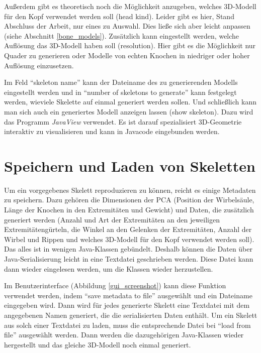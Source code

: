Außerdem gibt es theoretisch noch die Möglichkeit anzugeben, welches 3D-Modell für den Kopf verwendet werden soll (head kind). Leider gibt es hier, Stand Abschluss der Arbeit, nur eines zu Auswahl. Dies ließe sich aber leicht anpassen (siehe Abschnitt \ref{bone_models}).
Zusätzlich kann eingestellt werden, welche Auflösung das 3D-Modell haben soll (resolution). Hier gibt es die Möglichkeit nur Quader zu generieren oder Modelle von echten Knochen in niedriger oder hoher Auflösung einzusetzen.

Im Feld "`skeleton name"' kann der Dateiname des zu generierenden Modells eingestellt werden und in "`number of skeletons to generate"' kann festgelegt werden, wieviele Skelette auf einmal generiert werden sollen. Und schließlich kann man sich auch ein generiertes Modell anzeigen lassen (show skeleton). Dazu wird das Programm \emph{JavaView} \cite{JavaView} verwendet. Es ist darauf spezialisiert 3D-Geometrie interaktiv zu visualisieren und kann in Javacode eingebunden werden.


\section{Speichern und Laden von Skeletten}
\label{load_skeletons}

Um ein vorgegebenes Skelett reproduzieren zu können, reicht es einige Metadaten zu speichern. Dazu gehören die Dimensionen der PCA (Position der Wirbelsäule, Länge der Knochen in den Extremitäten und Gewicht) und Daten, die zusätzlich generiert werden (Anzahl und Art der Extremitäten an den jeweiligen Extremitätengürteln, die Winkel an den Gelenken der Extremitäten, Anzahl der Wirbel und Rippen und welches 3D-Modell für den Kopf verwendet werden soll).
Das alles ist in wenigen Java-Klassen gebündelt. Deshalb können die Daten über Java-Serialisierung \cite{JavaSerialization} leicht in eine Textdatei geschrieben werden. Diese Datei kann dann wieder eingelesen werden, um die Klassen wieder herzustellen.

Im Benutzerinterface (Abbildung \ref{gui_screenshot}) kann diese Funktion verwendet werden, indem "`save metadata to file"' ausgewählt und ein Dateiname eingegeben wird. Dann wird für jedes generierte Skelett eine Textdatei mit dem angegebenen Namen generiert, die die serialisierten Daten enthält.
Um ein Skelett aus solch einer Textdatei zu laden, muss die entsprechende Datei bei "`load from file"' ausgewählt werden. Dann werden die dazugehörigen Java-Klassen wieder hergestellt und das gleiche 3D-Modell noch einmal generiert.

